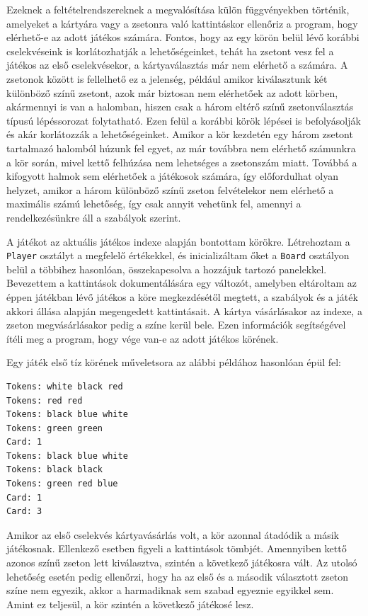 Ezeknek a feltételrendszereknek a megvalósítása külön függvényekben történik, amelyeket a kártyára vagy a zsetonra való kattintáskor ellenőriz a program, hogy elérhető-e az adott játékos számára. Fontos, hogy az egy körön belül lévő korábbi cselekvéseink is korlátozhatják a lehetőségeinket, tehát ha zsetont vesz fel a játékos az első cselekvésekor, a kártyaválasztás már nem elérhető a számára. A zsetonok között is fellelhető ez a jelenség, például amikor kiválasztunk két különböző színű zsetont, azok már biztosan nem elérhetőek az adott körben, akármennyi is van a halomban, hiszen csak a három eltérő színű zsetonválasztás típusú lépéssorozat folytatható. Ezen felül a korábbi körök lépései is befolyásolják és akár korlátozzák a lehetőségeinket. Amikor a kör kezdetén egy három zsetont tartalmazó halomból húzunk fel egyet, az már továbbra nem elérhető számunkra a kör során, mivel kettő felhúzása nem lehetséges a zsetonszám miatt. Továbbá a kifogyott halmok sem elérhetőek a játékosok számára, így előfordulhat olyan helyzet, amikor a három különböző színű zseton felvételekor nem elérhető a maximális számú lehetőség, így csak annyit vehetünk fel, amennyi a rendelkezésünkre áll a szabályok szerint.


A játékot az aktuális játékos indexe alapján bontottam körökre. Létrehoztam a \texttt{Player} osztályt a megfelelő értékekkel, és inicializáltam őket a \texttt{Board} osztályon belül a többihez hasonlóan, összekapcsolva a hozzájuk tartozó panelekkel. Bevezettem a kattintások dokumentálására egy változót, amelyben eltároltam az éppen játékban lévő játékos a köre megkezdésétől megtett, a szabályok és a játék akkori állása alapján megengedett kattintásait. A kártya vásárlásakor az indexe, a zseton megvásárlásakor pedig a színe kerül bele. Ezen információk segítségével ítéli meg a program, hogy vége van-e az adott játékos körének.

Egy játék első tíz körének műveletsora az alábbi példához hasonlóan épül fel:
\begin{verbatim}
Tokens: white black red 
Tokens: red red 
Tokens: black blue white 
Tokens: green green 
Card: 1 
Tokens: black blue white 
Tokens: black black 
Tokens: green red blue 
Card: 1 
Card: 3 
\end{verbatim}

Amikor az első cselekvés kártyavásárlás volt, a kör azonnal átadódik a másik játékosnak. Ellenkező esetben figyeli a kattintások tömbjét. Amennyiben kettő azonos színű zseton lett kiválasztva, szintén a következő játékosra vált. Az utolsó lehetőség esetén pedig ellenőrzi, hogy ha az első és a második választott zseton színe nem egyezik, akkor a harmadiknak sem szabad egyeznie egyikkel sem. Amint ez teljesül, a kör szintén a következő játékosé lesz.

